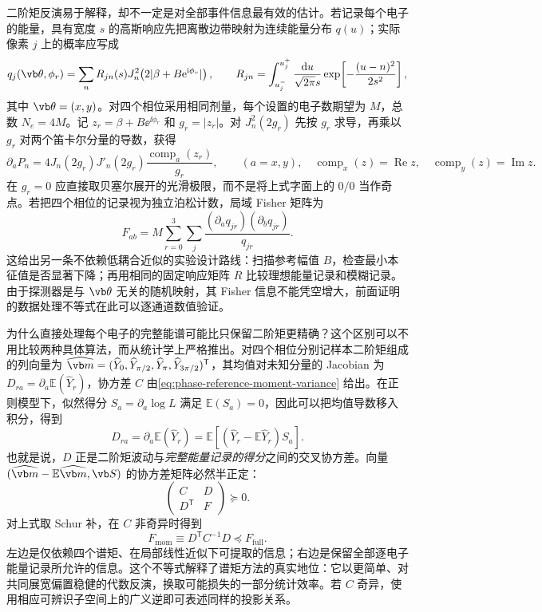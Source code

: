二阶矩反演易于解释，却不一定是对全部事件信息最有效的估计。若记录每个电子的能量，具有宽度 $s$ 的高斯响应先把离散边带映射为连续能量分布 $q(u)$；实际像素 $j$ 上的概率应写成
\begin{equation}
q_j(\vb\theta,\phi_r)=\sum_n R_{jn}(s)
J_n^2\!\left(2|\beta+B\ee^{\ii\phi_r}|\right),\qquad
R_{jn}=\int_{u_j^-}^{u_j^+}\frac{\dd u}{\sqrt{2\pi}s}
\exp\!\left[-\frac{(u-n)^2}{2s^2}\right],
\label{eq:phase-reference-response-kernel}
\end{equation}
其中 $\vb\theta=(x,y)$。对四个相位采用相同剂量，每个设置的电子数期望为 $M$，总数 $N_e=4M$。记 $z_r=\beta+B\ee^{\ii\phi_r}$ 和 $g_r=|z_r|$。对 $J_n^2(2g_r)$ 先按 $g_r$ 求导，再乘以 $g_r$ 对两个笛卡尔分量的导数，获得
\begin{equation}
\partial_a P_n=4J_n(2g_r)J'_n(2g_r)
\frac{\operatorname{comp}_a(z_r)}{g_r},\qquad
(a=x,y),\quad \operatorname{comp}_x(z)=\operatorname{Re}z,\quad
\operatorname{comp}_y(z)=\operatorname{Im}z.
\label{eq:phase-reference-score}
\end{equation}
在 $g_r=0$ 应直接取贝塞尔展开的光滑极限，而不是将上式字面上的 $0/0$ 当作奇点。若把四个相位的记录视为独立泊松计数，局域 Fisher 矩阵为
\begin{equation}
F_{ab}=M\sum_{r=0}^3\sum_j
\frac{(\partial_a q_{jr})(\partial_b q_{jr})}{q_{jr}}.
\label{eq:phase-reference-fisher}
\end{equation}
这给出另一条不依赖低耦合近似的实验设计路线：扫描参考幅值 $B$，检查最小本征值是否显著下降；再用相同的固定响应矩阵 $R$ 比较理想能量记录和模糊记录。由于探测器是与 $\vb\theta$ 无关的随机映射，其 Fisher 信息不能凭空增大，前面证明的数据处理不等式在此可以逐通道数值验证。


为什么直接处理每个电子的完整能谱可能比只保留二阶矩更精确？这个区别可以不用比较两种具体算法，而从统计学上严格推出。对四个相位分别记样本二阶矩组成的列向量为 $\widehat{\vb m}=(\widehat Y_0,\widehat Y_{\pi/2},\widehat Y_\pi,\widehat Y_{3\pi/2})^{\mathsf T}$，其均值对未知分量的 Jacobian 为 $D_{ra}=\partial_a\mathbb E(\widehat Y_r)$，协方差 $C$ 由\cref{eq:phase-reference-moment-variance} 给出。在正则模型下，似然得分 $S_a=\partial_a\log L$ 满足 $\mathbb E(S_a)=0$，因此可以把均值导数移入积分，得到
\[
D_{ra}=\partial_a\mathbb E(\widehat Y_r)
=\mathbb E\!\left[(\widehat Y_r-\mathbb E\widehat Y_r)S_a\right].
\]
也就是说，$D$ 正是二阶矩波动与\emph{完整能量记录的得分}之间的交叉协方差。向量 $(\widehat{\vb m}-\mathbb E\widehat{\vb m},\vb S)$ 的协方差矩阵必然半正定：
\[
\begin{pmatrix}C&D\\D^{\mathsf T}&F\end{pmatrix}\succeq0.
\]
对上式取 Schur 补，在 $C$ 非奇异时得到
\begin{equation}
F_{\mathrm{mom}}\equiv D^{\mathsf T}C^{-1}D\preceq F_{\mathrm{full}}.
\label{eq:phase-reference-moment-fisher}
\end{equation}
左边是仅依赖四个谱矩、在局部线性近似下可提取的信息；右边是保留全部逐电子能量记录所允许的信息。这个不等式解释了谱矩方法的真实地位：它以更简单、对共同展宽偏置稳健的代数反演，换取可能损失的一部分统计效率。若 $C$ 奇异，使用相应可辨识子空间上的广义逆即可表述同样的投影关系。

